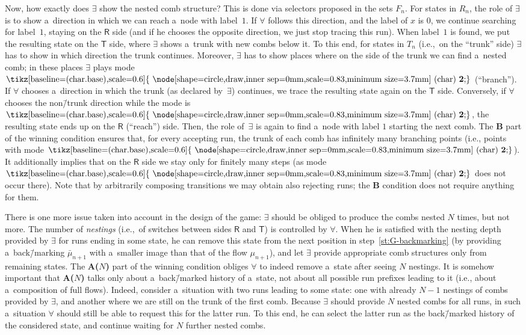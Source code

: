 \documentclass[11pt,a4paper]{amsart}
\theoremstyle{plain}
\theoremstyle{definition}
\theoremstyle{defC}
\theoremstyle{thmC}
\theoremstyle{plain}
\numberwithin{equation}{section}
\numberwithin{equation}{section}
\numberwithin{figure}{section}
\newcommand{\sT}{\mathsf{T}}
\newcommand{\sR}{\mathsf{R}}
\newcommand{\eve}{\ensuremath{\exists}\xspace}
\newcommand{\adam}{\ensuremath{\forall}\xspace}
\newcommand*\circled[1]{\tikz[baseline=(char.base),scale=0.6]{
            \node[shape=circle,draw,inner sep=0mm,scale=0.83,minimum size=3.7mm] (char) {\textbf{#1}};}}
\newcommand{\fb}{\mathbf{\text{\circled{2}}}}
\newcommand{\itemfont}[1]{\textbf{#1}}
\begin{document}
Now, how exactly does \eve show the nested comb structure?
This is done via selectors proposed in the sets $F_n$.
For states in $R_n$, the role of \eve is to show a~direction in which we can reach a~node with label~$1$.
If \adam follows this direction, and the label of $x$ is $0$, we continue searching for label~$1$, staying on the $\sR$ side
(and if he chooses the opposite direction, we just stop tracing this run).
When label~$1$ is found, we put the resulting state on the $\sT$ side, where \eve shows a~trunk with new combs below it.
To this end, for states in $T_n$ (i.e.,~on the ``trunk'' side) \eve has to show in which direction the trunk continues.
Moreover, \eve has to show places where on the side of the trunk we can find a~nested comb; in these places \eve plays mode~$\fb$ (``branch'').
If \adam chooses a~direction in which the trunk (as declared by~\eve) continues, we trace the resulting state again on the $\sT$ side.
Conversely, if \adam chooses the non\=/trunk direction while the mode is $\fb$, the resulting state ends up on the $\sR$ (``reach'') side.
Then, the role of~\eve is again to find a~node with label $1$ starting the next comb.
The \itemfont{B} part of the winning condition ensures that, for every accepting run, the trunk of each comb has infinitely many branching points (i.e., points with mode $\fb$).
It additionally implies that
on the $\sR$ side we stay only for finitely many steps (as mode $\fb$ does not occur there).
Note that by arbitrarily composing transitions we may obtain also rejecting runs; the \itemfont{B} condition does not require anything for them.

There is one more issue taken into account in the design of the game: \eve should be obliged to produce the combs nested $N$ times, but not more.
The number of \emph{nestings} (i.e.,~of switches between sides $\sR$ and $\sT$) is controlled by \adam.
When he is satisfied with the nesting depth provided by \eve for runs ending in some state,
he can remove this state from the next position in step~\ref{st:G-backmarking} (by providing a~back\=/marking $\bar\mu_{n+1}$ with a~smaller image than that of the flow $\mu_{n+1}$),
and let \eve provide appropriate comb structures only from remaining states.
The \itemfont{A($N$)} part of the winning condition obliges \adam to indeed remove a~state after seeing $N$ nestings.
It is somehow important that \itemfont{A($N$)} talks only about a~back\=/marked history of a~state, not about all possible run prefixes leading to it (i.e., about a~composition of full flows).
Indeed, consider a~situation with two runs leading to some state:
one with already $N{-}1$ nestings of combs provided by \eve, and another where we are still on the trunk of the first comb.
Because \eve should provide $N$ nested combs for all runs, in such a~situation \adam should still be able to request this for the latter run.
To this end, he can select the latter run as the back\=/marked history of the considered state, and continue waiting for $N$ further nested combs.
\end{document}
